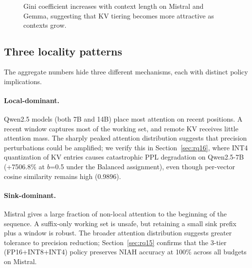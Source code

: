 \documentclass[11pt]{article}
\newcommand{\pct}{\%}
\theoremstyle{definition}
\theoremstyle{plain}
\begin{document}
\begin{figure}[t]
\centering
{}
\caption{Gini coefficient increases with context length on Mistral and Gemma, suggesting that KV tiering becomes more attractive as contexts grow.}
\label{fig:length-gini}
\end{figure}

\subsection{Three locality patterns}
The aggregate numbers hide three different mechanisms, each with distinct policy implications.

\paragraph{Local-dominant.} Qwen2.5 models (both 7B and 14B) place most attention on recent positions.  A recent window captures most of the working set, and remote KV receives little attention mass.  The sharply peaked attention distribution suggests that precision perturbations could be amplified; we verify this in Section~\ref{sec:rq16}, where INT4 quantization of KV entries causes catastrophic PPL degradation on Qwen2.5-7B (+7506.8\pct{} at $b$=0.5 under the Balanced assignment), even though per-vector cosine similarity remains high (0.9896).

\paragraph{Sink-dominant.} Mistral gives a large fraction of non-local attention to the beginning of the sequence.  A suffix-only working set is unsafe, but retaining a small sink prefix plus a window is robust.  The broader attention distribution suggests greater tolerance to precision reduction; Section~\ref{sec:rq15} confirms that the 3-tier (FP16+INT8+INT4) policy preserves NIAH accuracy at 100\pct{} across all budgets on Mistral.
\end{document}
